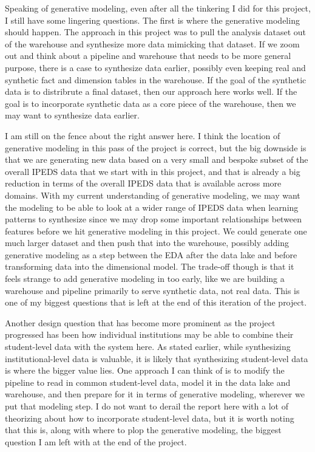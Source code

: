 \documentclass[sigconf, authorversion, nonacm]{acmart}
\begin{document}
    Speaking of generative modeling, even after all the tinkering I did for this project, I still have some lingering questions. The first is where the generative modeling should happen. The approach in this project was to pull the analysis dataset out of the warehouse and synthesize more data mimicking that dataset. If we zoom out and think about a pipeline and warehouse that needs to be more general purpose, there is a case to synthesize data earlier, possibly even keeping real and synthetic fact and dimension tables in the warehouse. If the goal of the synthetic data is to distribrute a final dataset, then our approach here works well. If the goal is to incorporate synthetic data as a core piece of the warehouse, then we may want to synthesize data earlier.

    I am still on the fence about the right answer here. I think the location of generative modeling in this pass of the project is correct, but the big downside is that we are generating new data based on a very small and bespoke subset of the overall IPEDS data that we start with in this project, and that is already a big reduction in terms of the overall IPEDS data that is available across more domains. With my current understanding of generative modeling, we may want the modeling to be able to look at a wider range of IPEDS data when learning patterns to synthesize since we may drop some important relationships between features before we hit generative modeling in this project. We could generate one much larger dataset and then push that into the warehouse, possibly adding generative modeling as a step between the EDA after the data lake and before transforming data into the dimensional model. The trade-off though is that it feels strange to add generative modeling in too early, like we are building a warehouse and pipeline primarily to serve synthetic data, not real data. This is one of my biggest questions that is left at the end of this iteration of the project.

    Another design question that has become more prominent as the project progressed has been how individual institutions may be able to combine their student-level data with the system here. As stated earlier, while synthesizing institutional-level data is valuable, it is likely that synthesizing student-level data is where the bigger value lies. One approach I can think of is to modify the pipeline to read in common student-level data, model it in the data lake and warehouse, and then prepare for it in terms of generative modeling, wherever we put that modeling step. I do not want to derail the report here with a lot of theorizing about how to incorporate student-level data, but it is worth noting that this is, along with where to plop the generative modeling, the biggest question I am left with at the end of the project.
\end{document}
